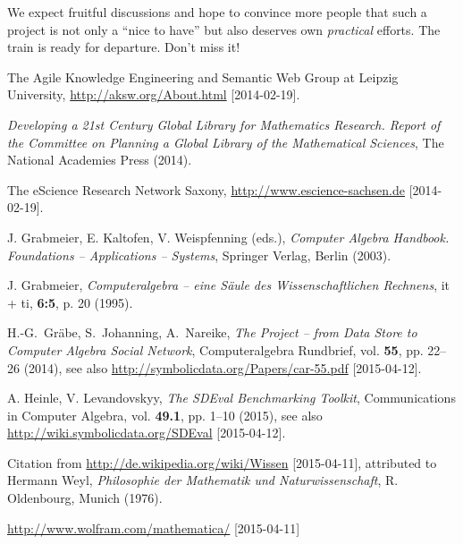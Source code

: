 \documentclass[11pt]{article}
\begin{document}
We expect fruitful discussions and hope to convince more people that such a
project is not only a ``nice to have'' but also deserves own \emph{practical}
efforts.  The train is ready for departure. Don't miss it!



\begin{thebibliography}{00}
\setlength{\itemsep}{-1mm}
\footnotesize\raggedright

 The Agile Knowledge Engineering and Semantic Web Group at
  Leipzig University, \url{http://aksw.org/About.html} [2014-02-19].

 \textit{Developing a 21st Century Global Library for Mathematics
  Research.  Report of the Committee on Planning a Global Library of the
  Mathematical Sciences}, The National Academies Press (2014).

 The eScience Research Network Saxony,
  \url{http://www.escience-sachsen.de} [2014-02-19].

 J. Grabmeier, E. Kaltofen, V. Weispfenning (eds.),
  \textit{Computer Algebra Handbook. Foundations -- Applications -- Systems},
  Springer Verlag, Berlin (2003).

 J. Grabmeier, \textit{Computeralgebra -- eine S\"aule des
  Wissenschaftlichen Rechnens},  it + ti, \textbf{6:5}, p. 20 (1995).

 H.-G.\ Gr\"abe, S.\ Johanning, A.\ Nareike, \textit{The {\SD}
  Project -- from Data Store to Computer Algebra Social Network},
  Computeralgebra Rundbrief, vol. \textbf{55}, pp. 22--26 (2014), see also
  \url{http://symbolicdata.org/Papers/car-55.pdf} [2015-04-12].

 A. Heinle, V. Levandovskyy, \textit{The SDEval Benchmarking
  Toolkit}, Communications in Computer Algebra, vol. \textbf{49.1},
  pp. 1--10 (2015), see also \url{http://wiki.symbolicdata.org/SDEval}
  [2015-04-12].

 Citation from \url{http://de.wikipedia.org/wiki/Wissen}
  [2015-04-11], attributed to Hermann Weyl, \textit{Philosophie der Mathematik
    und Naturwissenschaft}, R. Oldenbourg, Munich (1976).  

 \url{http://www.wolfram.com/mathematica/} [2015-04-11]


\end{thebibliography}
\end{document}
